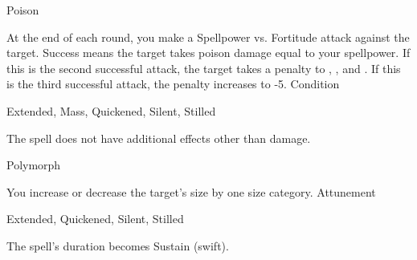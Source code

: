 \begin{spellsection}{Poison}
\begin{spellheader}
\end{spellheader}
\begin{spellcontent}
\begin{spelltargetinginfo}
\end{spelltargetinginfo}
\begin{spelleffects}
\spelleffect
At the end of each round, you make a Spellpower vs. Fortitude attack against the target.
Success means the target takes poison damage equal to your spellpower.
If this is the second successful attack, the target takes a  penalty to , , and .
If this is the third successful attack, the penalty increases to -5.
\spelldur Condition
\end{spelleffects}
\end{spellcontent}
\begin{spellfooter}
 Extended, Mass, Quickened, Silent, Stilled
\end{spellfooter}
\begin{spellsubcontent}
\begin{spellcantrip}
The spell does not have additional effects other than damage.
\end{spellcantrip}
\end{spellsubcontent}
\end{spellsection}
\begin{spellsection}{Polymorph}
\begin{spellheader}
\end{spellheader}
\begin{spellcontent}
\begin{spelltargetinginfo}
\end{spelltargetinginfo}
\begin{spelleffects}
\spelleffect
You increase or decrease the target's size by one size category.
\spelldur Attunement
\end{spelleffects}
\end{spellcontent}
\begin{spellfooter}
 Extended, Quickened, Silent, Stilled
\end{spellfooter}
\begin{spellsubcontent}
\begin{spellcantrip}
The spell's duration becomes Sustain (swift).
\end{spellcantrip}
\end{spellsubcontent}
\end{spellsection}
